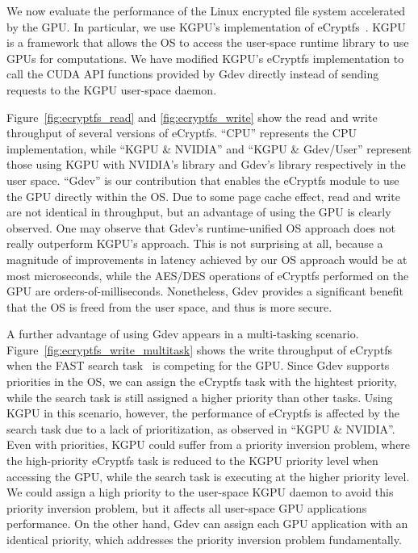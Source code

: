 We now evaluate the performance of the Linux encrypted file system
accelerated by the GPU.
In particular, we use KGPU's implementation of
eCryptfs~\cite{Sun_SYSTOR12}.
KGPU is a framework that allows the OS to access the user-space runtime
library to use GPUs for computations.
We have modified KGPU's eCryptfs implementation to call the CUDA API
functions provided by Gdev directly instead of sending requests to the
KGPU user-space daemon.

Figure~\ref{fig:ecryptfs_read} and \ref{fig:ecryptfs_write} show the
read and write throughput of several versions of eCryptfs.
``CPU'' represents the CPU implementation, while ``KGPU \& NVIDIA'' and
``KGPU \& Gdev/User'' represent those using KGPU with NVIDIA's library
and Gdev's library respectively in the user space. 
``Gdev'' is our contribution that enables the eCryptfs module to use the
GPU directly within the OS.
Due to some page cache effect, read and write are not identical in
throughput, but an advantage of using the GPU is clearly observed.
One may observe that Gdev's runtime-unified OS approach does not really
outperform KGPU's approach.
This is not surprising at all, because a magnitude of improvements in
latency achieved by our OS approach would be at most microseconds, while
the AES/DES operations of eCryptfs performed on the GPU are
orders-of-milliseconds.
Nonetheless, Gdev provides a significant benefit that the OS is freed
from the user space, and thus is more secure.

A further advantage of using Gdev appears in a multi-tasking scenario.
Figure~\ref{fig:ecryptfs_write_multitask} shows the write throughput of
eCryptfs when the FAST search task~\cite{Kim_SIGMOD10} is competing for
the GPU.
Since Gdev supports priorities in the OS, we can assign the eCryptfs
task with the hightest priority, while the search task is still assigned
a higher priority than other tasks.
Using KGPU in this scenario, however, the performance of eCryptfs is
affected by the search task due to a lack of prioritization, as observed
in ``KGPU \& NVIDIA''.
Even with priorities, KGPU could suffer from a priority inversion
problem, where the high-priority eCryptfs task is reduced to the KGPU
priority level when accessing the GPU, while the search task is
executing at the higher priority level.
We could assign a high priority to the user-space KGPU daemon to avoid
this priority inversion problem, but it affects all user-space GPU
applications performance. 
On the other hand, Gdev can assign each GPU application with an
identical priority, which addresses the priority inversion problem
fundamentally.

